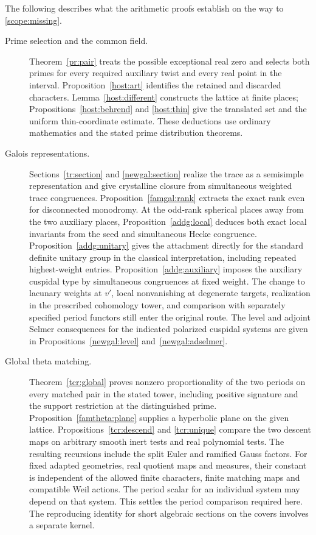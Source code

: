 The following describes what the arithmetic proofs establish on the way to \eqref{scope:missing}.
\begin{description}
\item[Prime selection and the common field.] Theorem~\ref{pr:pair} treats the possible exceptional real zero and selects both primes for every required auxiliary twist and every real point in the interval. Proposition~\ref{host:art} identifies the retained and discarded characters. Lemma~\ref{host:different} constructs the lattice at finite places; Propositions~\ref{host:behrend} and \ref{host:thin} give the translated set and the uniform thin-coordinate estimate. These deductions use ordinary mathematics and the stated prime distribution theorems.
\item[Galois representations.] Sections~\ref{tr:section} and \ref{newgal:section} realize the trace as a semisimple representation and give crystalline closure from simultaneous weighted trace congruences. Proposition~\ref{famgal:rank} extracts the exact rank even for disconnected monodromy. At the odd-rank spherical places away from the two auxiliary places, Proposition~\ref{addg:local} deduces both exact local invariants from the seed and simultaneous Hecke congruence. Proposition~\ref{addg:unitary} gives the attachment directly for the standard definite unitary group in the classical interpretation, including repeated highest-weight entries. Proposition~\ref{addg:auxiliary} imposes the auxiliary cuspidal type by simultaneous congruences at fixed weight. The change to lacunary weights at \(v'\), local nonvanishing at degenerate targets, realization in the prescribed cohomology tower, and comparison with separately specified period functors still enter the original route. The level and adjoint Selmer consequences for the indicated polarized cuspidal systems are given in Propositions~\ref{newgal:level} and~\ref{newgal:adselmer}.
\item[Global theta matching.] Theorem~\ref{tcr:global} proves nonzero proportionality of the two periods on every matched pair in the stated tower, including positive signature and the support restriction at the distinguished prime. Proposition~\ref{famtheta:plane} supplies a hyperbolic plane on the given lattice. Propositions~\ref{tcr:descend} and \ref{tcr:unique} compare the two descent maps on arbitrary smooth inert tests and real polynomial tests. The resulting recursions include the split Euler and ramified Gauss factors. For fixed adapted geometries, real quotient maps and measures, their constant is independent of the allowed finite characters, finite matching maps and compatible Weil actions. The period scalar for an individual system may depend on that system. This settles the period comparison required here. The reproducing identity for short algebraic sections on the covers involves a separate kernel.

\end{description}
